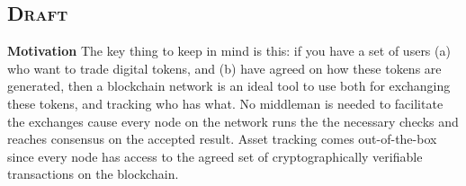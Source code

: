     
    
    
    
    \subsection*{\textsc{Draft}}
    \textbf{Motivation}\linebreak
    The key thing to keep in mind is this: if you have a set of users (a) who want to trade digital tokens, and (b) have agreed on how these tokens are generated, then a blockchain network is an ideal tool to use both for exchanging these tokens, and tracking who has what. No middleman is needed to facilitate the exchanges cause every node on the network runs the the necessary checks and reaches consensus on the accepted result. Asset tracking comes out-of-the-box since every node has access to the agreed set of cryptographically verifiable transactions on the blockchain.\cite{Christidis2016}